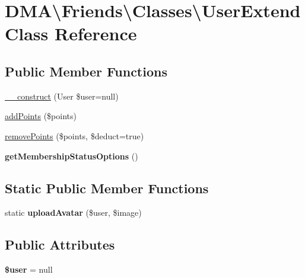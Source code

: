 \hypertarget{classDMA_1_1Friends_1_1Classes_1_1UserExtend}{\section{D\+M\+A\textbackslash{}Friends\textbackslash{}Classes\textbackslash{}User\+Extend Class Reference}
\label{classDMA_1_1Friends_1_1Classes_1_1UserExtend}
}
\subsection*{Public Member Functions}
\begin{DoxyCompactItemize}
\item 
\hyperlink{classDMA_1_1Friends_1_1Classes_1_1UserExtend_aa399d503ccb972cb46171bd7cc2fbadf}{\+\_\+\+\_\+construct} (User \$user=null)
\item 
\hyperlink{classDMA_1_1Friends_1_1Classes_1_1UserExtend_ae2d0cddf99425d8ffbe2ed2c74372024}{add\+Points} (\$points)
\item 
\hyperlink{classDMA_1_1Friends_1_1Classes_1_1UserExtend_a72299c6e170b749617a262f18a8d7d67}{remove\+Points} (\$points, \$deduct=true)
\item 
\hypertarget{classDMA_1_1Friends_1_1Classes_1_1UserExtend_ac1de8e9326eaa1466503bf34fa0a3748}{{\bfseries get\+Membership\+Status\+Options} ()}\label{classDMA_1_1Friends_1_1Classes_1_1UserExtend_ac1de8e9326eaa1466503bf34fa0a3748}

\end{DoxyCompactItemize}
\subsection*{Static Public Member Functions}
\begin{DoxyCompactItemize}
\item 
\hypertarget{classDMA_1_1Friends_1_1Classes_1_1UserExtend_a0052edba29ca35647646bd33a05d9ccf}{static {\bfseries upload\+Avatar} (\$user, \$image)}\label{classDMA_1_1Friends_1_1Classes_1_1UserExtend_a0052edba29ca35647646bd33a05d9ccf}

\end{DoxyCompactItemize}
\subsection*{Public Attributes}
\begin{DoxyCompactItemize}
\item 
\hypertarget{classDMA_1_1Friends_1_1Classes_1_1UserExtend_ab5502f589b8c00f7a847a3ebece55281}{{\bfseries \$user} = null}\label{classDMA_1_1Friends_1_1Classes_1_1UserExtend_ab5502f589b8c00f7a847a3ebece55281}

\end{DoxyCompactItemize}


